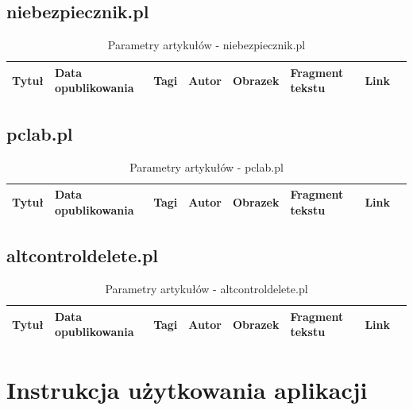 \documentclass[12pt, titlepage]{article}
\begin{document}
		\subsection{niebezpiecznik.pl} 
		\begin{table}[H]
			\centering
			\caption{Parametry artykułów - niebezpiecznik.pl}
			\label{niebezpiecznik_parametry}
			\begin{tabular}{ | C{1.5cm} | C{4cm} | C{1.5cm} | C{1.5cm} | C{1.5cm} | C{3cm} | C{1.5cm} | @{}m{0pt}@{}}
				\hline
				Tytuł & Data opublikowania & Tagi & Autor & Obrazek & Fragment tekstu & Link &\\[0.5cm]
				\hline
			\end{tabular}
		\end{table}
		\subsection{pclab.pl} 
		\begin{table}[H]
			\centering
			\caption{Parametry artykułów - pclab.pl}
			\label{z3s_parametry}
			\begin{tabular}{ | C{1.5cm} | C{4cm} | C{1.5cm} | C{1.5cm} | C{1.5cm} | C{3cm} | C{1.5cm} | @{}m{0pt}@{}}
				\hline
				Tytuł & Data opublikowania & Tagi & Autor & Obrazek & Fragment tekstu & Link &\\[0.5cm]
				\hline
			\end{tabular}
		\end{table}
		\subsection{altcontroldelete.pl} 
		\begin{table}[H]
			\centering
			\caption{Parametry artykułów - altcontroldelete.pl}
			\label{wykop_parametry}
			\begin{tabular}{ | C{1.5cm} | C{4cm} | C{1.5cm} | C{1.5cm} | C{1.5cm} | C{3cm} | C{1.5cm} | @{}m{0pt}@{}}
				\hline
				Tytuł & Data opublikowania & Tagi & Autor & Obrazek & Fragment tekstu & Link &\\[0.5cm]
				\hline
			\end{tabular}
		\end{table}
	
	\newpage
	\section{Instrukcja użytkowania aplikacji}
	
\end{document}
